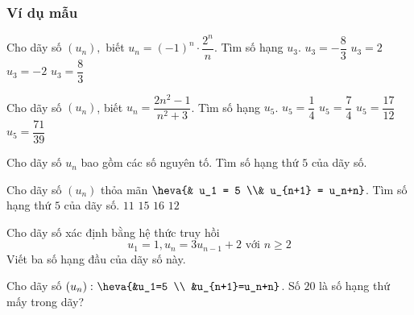 \subsubsection{Ví dụ mẫu}
\begin{vd}[NB]%
	Cho dãy số $(u_n),$ biết $u_n=(-1 )^n\cdot \dfrac{2^n}{n}$. Tìm số hạng $u_3$.
	\choice
	{\True $u_3=-\dfrac{8}{3}$}
	{$u_3=2$}
	{$u_3=-2$}
	{$u_3=\dfrac{8}{3}$}
\end{vd}
\begin{vd}[NB]%
	Cho dãy số $(u_n)$, biết $u_n=\dfrac{2n^2-1}{n^2+3}$. Tìm số hạng $u_5$.
	\choice
	{$u_5=\dfrac{1}{4}$}
	{\True $u_5=\dfrac{7}{4}$}
	{$u_5=\dfrac{17}{12}$}
	{$u_5=\dfrac{71}{39}$}
	
\end{vd}
\begin{vd}[NB]%
	Cho dãy số $u_n$ bao gồm các số nguyên tố. Tìm số hạng thứ $5$ của dãy số.
\end{vd}
\begin{vd}[NB]%
	Cho dãy số $(u_n) $ thỏa mãn $ \heva{& u_1 = 5 \\& u_{n+1} = u_n+n}$. Tìm số hạng thứ $5$ của dãy số.
	\choice
	{$ 11 $}
	{\True $ 15 $}
	{$ 16 $}
	{$ 12 $}
\end{vd}

\begin{vd}[TH]%
	Cho dãy số xác định bằng hệ thức truy hồi
	$$
	u_1=1, u_n=3 u_{n-1}+2 \text { với } n \geq 2
	$$
	Viết ba số hạng đầu của dãy số này.
\end{vd}

\begin{vd}[VD]%
	Cho dãy số $\left(u_n\right)\colon\heva{&u_1=5 \\ &u_{n+1}=u_n+n}$. Số $20$ là số hạng thứ mấy trong dãy?
\end{vd}

